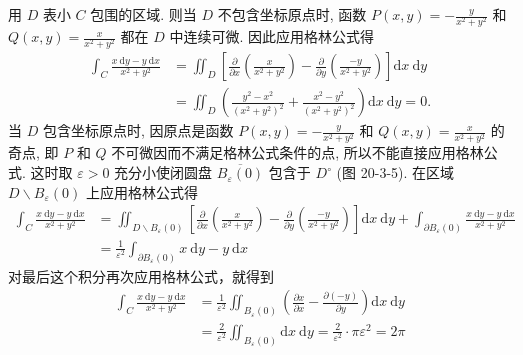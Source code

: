\begin{solution}
    用 $D$ 表小 $C$ 包围的区域. 则当 $D$ 不包含坐标原点时, 函数 $P(x, y)=-\frac{y}{x^2+y^2}$ 和 $Q(x, y)=\frac{x}{x^2+y^2}$ 都在 $D$ 中连续可微. 因此应用格林公式得
$$
\begin{aligned}
\int_C \frac{x \mathrm{~d} y-y \mathrm{~d} x}{x^2+y^2} & =\iint_D\left[\frac{\partial}{\partial x}\left(\frac{x}{x^2+y^2}\right)-\frac{\partial}{\partial y}\left(\frac{-y}{x^2+y^2}\right)\right] \mathrm{d} x \mathrm{~d} y \\
& =\iint_D\left(\frac{y^2-x^2}{\left(x^2+y^2\right)^2}+\frac{x^2-y^2}{\left(x^2+y^2\right)^2}\right) \mathrm{d} x \mathrm{~d} y=0 .
\end{aligned}
$$
当 $D$ 包含坐标原点时, 因原点是函数 $P(x, y)=-\frac{y}{x^2+y^2}$ 和 $Q(x, y)=\frac{x}{x^2+y^2}$ 的奇点, 即 $P$ 和 $Q$ 不可微因而不满足格林公式条件的点, 所以不能直接应用格林公式. 这时取 $\varepsilon>0$ 充分小使闭圆盘 $\overline{B_{\varepsilon}(0)}$ 包含于 $D^{\circ}$ (图 20-3-5). 在区域 $D \backslash B_{\varepsilon}(0)$ 上应用格林公式得
$$
\begin{aligned}
\int_C \frac{x \mathrm{~d} y-y \mathrm{~d} x}{x^2+y^2} & =\iint_{D \backslash B_{\varepsilon}(0)}\left[\frac{\partial}{\partial x}\left(\frac{x}{x^2+y^2}\right)-\frac{\partial}{\partial y}\left(\frac{-y}{x^2+y^2}\right)\right] \mathrm{d} x \mathrm{~d} y+\int_{\partial B_{\varepsilon}(0)} \frac{x \mathrm{~d} y-y \mathrm{~d} x}{x^2+y^2} \\
& =\frac{1}{\varepsilon^2} \int_{\partial B_{\varepsilon}(0)} x \mathrm{~d} y-y \mathrm{~d} x
\end{aligned}
$$
对最后这个积分再次应用格林公式，就得到
$$
\begin{aligned}
\int_C \frac{x \mathrm{~d} y-y \mathrm{~d} x}{x^2+y^2} & =\frac{1}{\varepsilon^2} \iint_{B_{\varepsilon}(0)}\left(\frac{\partial x}{\partial x}-\frac{\partial(-y)}{\partial y}\right) \mathrm{d} x \mathrm{~d} y \\
& =\frac{2}{\varepsilon^2} \iint_{B_{\varepsilon}(0)} \mathrm{d} x \mathrm{~d} y=\frac{2}{\varepsilon^2} \cdot \pi \varepsilon^2=2 \pi
\end{aligned}
$$
\end{solution}



